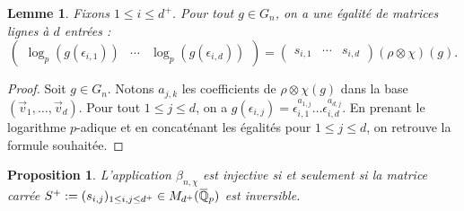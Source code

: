 \documentclass[12pt]{amsart}
\newcommand\bQ{\mathbb{Q}}
\newcommand{\ob}[1]{\mkern 1.5mu\overline{\mkern-1.5mu#1\mkern-1.5mu}\mkern 1.5mu}
\theoremstyle{defstyle}
\theoremstyle{thmstyle}
\newtheorem{proposition}[subsubsection]{Proposition}
\newtheorem{lemme}[subsubsection]{Lemme}
\begin{document}
\begin{lemme}\label{lem:calcul_matriciel}
	Fixons $1\leq i\leq d^+$. Pour tout $g\in G_n$, on a une égalité de matrices lignes à $d$ entrées : 
	$$\begin{pmatrix} \log_p\left(g(\epsilon_{i,1})\right) & \cdots &\log_p\left(g(\epsilon_{i,d})\right)\end{pmatrix}=\begin{pmatrix}
	s_{i,1} & \cdots &  s_{i,d}
	\end{pmatrix} \left(\rho\otimes\chi\right)(g).$$
\end{lemme}
\begin{proof}
	Soit $g\in G_n$. Notons $a_{j,k}$ les coefficients de $\rho\otimes\chi(g)$ dans la base $(\vec{v}_1,\ldots,\vec{v}_d)$. Pour tout $1\leq j\leq d$, on a $g(\epsilon_{i,j})=\epsilon_{i,1}^{a_{1,j}} \ldots \epsilon_{i,d}^{a_{d,j}}$. En prenant le logarithme $p$-adique et en concaténant les égalités pour $1\leq j\leq d$, on retrouve la formule souhaitée.
\end{proof}

\begin{proposition}\label{prop:S^+}
	L'application $\beta_{n,\chi}$ est injective si et seulement si la matrice carrée $S^+:=(s_{i,j})_{1\leq i,j\leq d^+} \in M_{d^+}(\ob{\bQ}_p)$ est inversible. 
\end{proposition}
\end{document}
